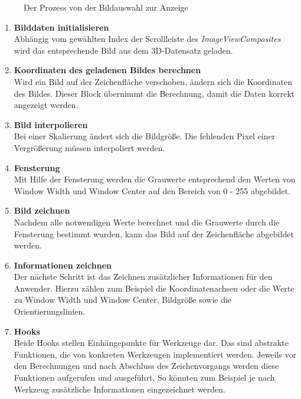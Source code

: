 \begin{figure}[htbp]
  \vspace{0.5cm}
  \centering
   \caption{Der Prozess von der Bildauswahl zur Anzeige}
  \label{imageprocess}
  \vspace{0.5cm}
\end{figure}

\begin{enumerate}
\item \textbf{Bilddaten initialisieren}\\
	Abhängig vom gewählten Index der Scrollleiste des \textit{ImageViewComposites} wird das entsprechende Bild aus dem 3D-Datensatz geladen.
\item \textbf{Koordinaten des geladenen Bildes berechnen}\\
	Wird ein Bild auf der Zeichenfläche verschoben, ändern sich die Koordinaten des Bildes. Dieser Block übernimmt die Berechnung, damit die Daten korrekt angezeigt werden.
\item \textbf{Bild interpolieren}\\
	Bei einer Skalierung ändert sich die Bildgröße. Die fehlenden Pixel einer Vergrößerung müssen interpoliert werden.
\item \textbf{Fensterung}\\
	Mit Hilfe der Fensterung werden die Grauwerte entsprechend den Werten von Window Width und Window Center auf den Bereich von 0 - 255 abgebildet.
\item \textbf{Bild zeichnen}\\
	Nachdem alle notwendigen Werte berechnet und die Grauwerte durch die Fensterung bestimmt wurden, kann das Bild auf der Zeichenfläche abgebildet werden.
\item \textbf{Informationen zeichnen}\\
	Der nächste Schritt ist das Zeichnen zusätzlicher Informationen für den Anwender. Hierzu zählen zum Beispiel die Koordinatenachsen oder die Werte zu Window Width und Window Center, Bildgröße sowie die Orientierungslinien.
\item \textbf{Hooks}\\
	Beide Hooks stellen Einhängepunkte für Werkzeuge dar. Das sind abstrakte Funktionen, die von konkreten Werkzeugen implementiert werden. Jeweils vor den Berechnungen und nach Abschluss des Zeichenvorgangs werden diese Funktionen aufgerufen und ausgeführt. So könnten zum Beispiel je nach Werkzeug zusätzliche Informationen eingezeichnet werden.
\end{enumerate}

